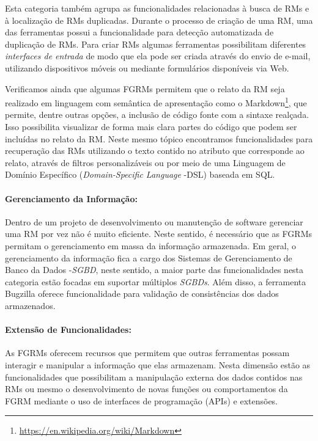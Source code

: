 Esta categoria também agrupa as funcionalidades relacionadas à busca de RMs e à
localização de RMs duplicadas. Durante o processo de criação de uma RM, uma das
ferramentas possui a funcionalidade para detecção automatizada de duplicação de
RMs. Para criar RMs algumas ferramentas possibilitam diferentes
\textit{interfaces de entrada} de modo que ela pode ser criada através do envio
de e-mail, utilizando dispositivos móveis ou mediante formulários disponíveis
via Web\@.

Verificamos ainda que algumas FGRMs permitem que o relato da RM seja realizado
em linguagem com semântica de apresentação como o
Markdown\footnote{\url{https://en.wikipedia.org/wiki/Markdown}}, que permite,
dentre outras opções, a inclusão de código fonte com a sintaxe realçada. Isso
possibilita visualizar de forma mais clara partes do código que podem ser
incluídas no relato da RM\@. Neste mesmo tópico encontramos funcionalidades
para recuperação das RMs utilizando o texto contido no atributo que corresponde
ao relato, através de filtros personalizáveis ou por meio de uma Linguagem de
Domínio Específico (\textit{Domain-Specific Language} \@-\@ DSL) baseada em
SQL\@.

\paragraph{Gerenciamento da Informação:}
\label{par:gerenciamento_da_informação}

Dentro de um projeto de desenvolvimento ou manutenção de software gerenciar uma
RM por vez não é muito eficiente. Neste sentido, é necessário que as FGRMs
permitam o gerenciamento em massa da informação armazenada. Em geral, o
gerenciamento da informação fica a cargo dos Sistemas de Gerenciamento de Banco
da Dados \@-\@ \textit{SGBD}, neste sentido, a maior parte das funcionalidades
nesta categoria estão focadas em suportar múltiplos \textit{SGBDs}. Além disso,
a ferramenta Bugzilla oferece funcionalidade para validação de consistências
dos dados armazenados.

\paragraph{Extensão de Funcionalidades:}
\label{par:extensão_de_funcionalidades}

As FGRMs oferecem recursos que permitem que outras ferramentas possam interagir
e manipular a informação que elas armazenam. Nesta dimensão estão as
funcionalidades que possibilitam a manipulação externa dos dados contidos nas
RMs ou mesmo o desenvolvimento de novas funções ou comportamentos da FGRM
mediante o uso de interfaces de programação (APIs) e extensões.

